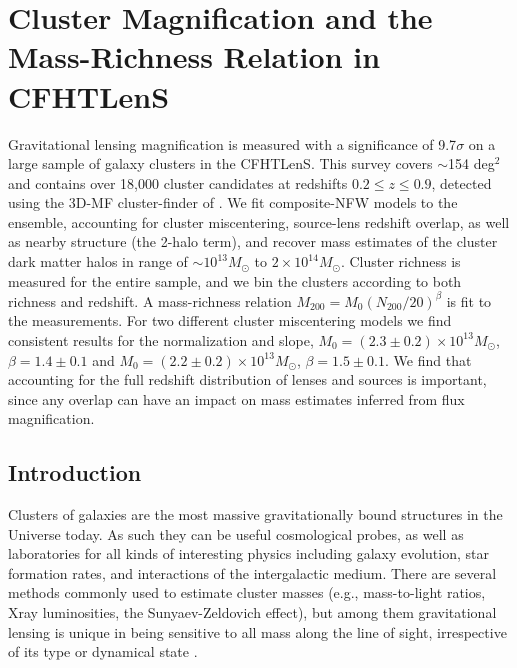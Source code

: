 
\chapter{Cluster Magnification and the Mass-Richness Relation in CFHTLenS}
\label{ch3}

Gravitational lensing magnification is measured with a significance of 9.7$\sigma$ on a large sample of galaxy clusters in the \acf{CFHTLenS}. This survey covers $\sim$154 deg$^2$ and contains over 18,000 cluster candidates at redshifts $0.2 \leq z \leq 0.9$, detected using the \acf{3D-MF} cluster-finder of \citet{Milkeraitis10}. We fit composite-\ac{NFW} models to the ensemble, accounting for cluster miscentering, source-lens redshift overlap, as well as nearby structure (the 2-halo term), and recover mass estimates of the cluster dark matter halos in range of $\sim10^{13} M_\odot$ to $2\times10^{14} M_\odot$. Cluster richness is measured for the entire sample, and we bin the clusters according to both richness and redshift. A mass-richness relation $M_{200} = M_0 (N_{200} / 20)^\beta$ is fit to the measurements. For two different cluster miscentering models we find consistent results for the normalization and slope,  $M_0 = (2.3 \pm 0.2) \times 10^{13} M_\odot$, $\beta = 1.4 \pm 0.1$ and $M_0 = (2.2 \pm 0.2) \times 10^{13} M_\odot$, $\beta = 1.5 \pm 0.1$. We find that accounting for the full redshift distribution of lenses and sources is important, since any overlap can have an impact on mass estimates inferred from flux magnification.


\section{Introduction}
Clusters of galaxies are the most massive gravitationally bound structures in the Universe today. As such they can be useful cosmological probes, as well as laboratories for all kinds of interesting physics including galaxy evolution, star formation rates, and interactions of the intergalactic medium. There are several methods commonly used to estimate cluster masses (e.g., mass-to-light ratios, Xray luminosities, the Sunyaev-Zeldovich effect), but among them gravitational lensing is unique in being sensitive to all mass along the line of sight, irrespective of its type or dynamical state \citep{BS01}.

